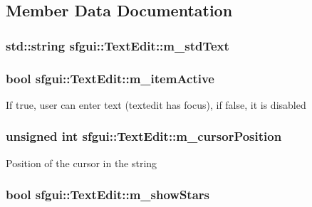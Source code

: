 \subsection{Member Data Documentation}
\hypertarget{classsfgui_1_1TextEdit_08de851a32aa8dd650e33dfcb376bfd8}{
\subsubsection[m\_\-stdText]{\setlength{\rightskip}{0pt plus 5cm}std::string {\bf sfgui::TextEdit::m\_\-stdText}}}
\label{classsfgui_1_1TextEdit_08de851a32aa8dd650e33dfcb376bfd8}


\hypertarget{classsfgui_1_1TextEdit_8ffa5546b2fd4901837b13a118f9beef}{
\subsubsection[m\_\-itemActive]{\setlength{\rightskip}{0pt plus 5cm}bool {\bf sfgui::TextEdit::m\_\-itemActive}}}
\label{classsfgui_1_1TextEdit_8ffa5546b2fd4901837b13a118f9beef}


If true, user can enter text (textedit has focus), if false, it is disabled \hypertarget{classsfgui_1_1TextEdit_9392f92ba9efe59f56801ec3c0e52ccb}{
\subsubsection[m\_\-cursorPosition]{\setlength{\rightskip}{0pt plus 5cm}unsigned int {\bf sfgui::TextEdit::m\_\-cursorPosition}}}
\label{classsfgui_1_1TextEdit_9392f92ba9efe59f56801ec3c0e52ccb}


Position of the cursor in the string \hypertarget{classsfgui_1_1TextEdit_c4a8a483ad2fcdaa9201489665774e19}{
\subsubsection[m\_\-showStars]{\setlength{\rightskip}{0pt plus 5cm}bool {\bf sfgui::TextEdit::m\_\-showStars}}}
\label{classsfgui_1_1TextEdit_c4a8a483ad2fcdaa9201489665774e19}


